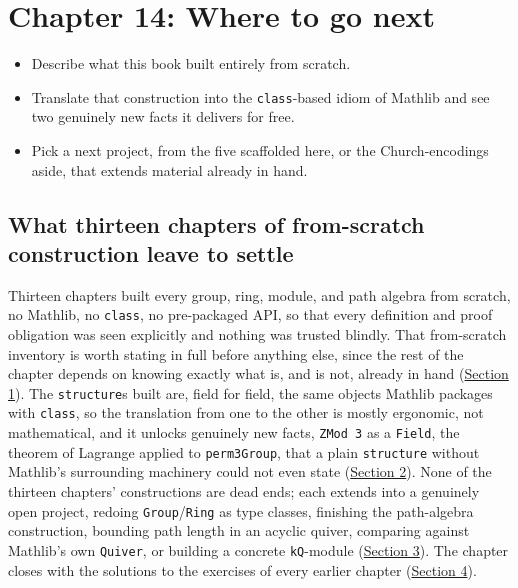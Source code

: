 \chapter{Chapter 14: Where to go next}\label{sec:14-next-steps:00-index:1}

\begin{learningobjectives}
\begin{itemize}
\tightlist
\item
  Describe what this book built entirely from scratch.
\item
  Translate that construction into the \texttt{class}-based idiom of Mathlib and see two genuinely new facts it delivers for free.
\item
  Pick a next project, from the five scaffolded here, or the Church-encodings aside, that extends material already in hand.
\end{itemize}
\end{learningobjectives}


\section{What thirteen chapters of from-scratch construction leave to settle}\label{sec:14-next-steps:00-index:2}

Thirteen chapters built every group, ring, module, and path algebra from scratch, no Mathlib, no \texttt{class}, no pre-packaged API, so that every definition and proof obligation was seen explicitly and nothing was trusted blindly. That from-scratch inventory is worth stating in full before anything else, since the rest of the chapter depends on knowing exactly what is, and is not, already in hand (\hyperref[sec:14-next-steps:01-what-we-built:1]{Section 1}). The \texttt{structure}s built are, field for field, the same objects Mathlib packages with \texttt{class}, so the translation from one to the other is mostly ergonomic, not mathematical, and it unlocks genuinely new facts, \texttt{ZMod 3} as a \texttt{Field}, the theorem of Lagrange applied to \texttt{perm3Group}, that a plain \texttt{structure} without Mathlib's surrounding machinery could not even state (\hyperref[sec:14-next-steps:02-moving-to-mathlib:1]{Section 2}). None of the thirteen chapters' constructions are dead ends; each extends into a genuinely open project, redoing \texttt{Group}/\texttt{Ring} as type classes, finishing the path-algebra construction, bounding path length in an acyclic quiver, comparing against Mathlib's own \texttt{Quiver}, or building a concrete \texttt{kQ}-module (\hyperref[sec:14-next-steps:03-next-projects:1]{Section 3}). The chapter closes with the solutions to the exercises of every earlier chapter (\hyperref[sec:14-next-steps:04-solutions:1]{Section 4}).






